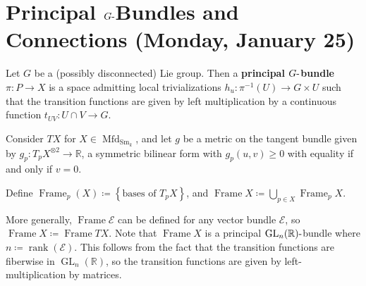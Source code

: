 \hypertarget{principal-ghbox-bundles-and-connections-monday-january-25}{%
\section{\texorpdfstring{Principal \(G{\hbox{-}}\)Bundles and
Connections (Monday, January
25)}{Principal G\{\textbackslash hbox\{-\}\}Bundles and Connections (Monday, January 25)}}\label{principal-ghbox-bundles-and-connections-monday-january-25}}

\begin{definition}

Let \(G\) be a (possibly disconnected) Lie group. Then a
\textbf{principal \(G{\hbox{-}}\)bundle} \(\pi:P\to X\) is a space
admitting local trivializations \(h_u: \pi ^{-1} (U) \to G \times U\)
such that the transition functions are given by left multiplication by a
continuous function \(t_{UV}: U \cap V \to G\).

\end{definition}

\begin{figure}
\centering
{}
\end{figure}

Consider \(TX\) for \(X\in {\operatorname{Mfd}}_{\operatorname{Sm}_k}\),
and let \(g\) be a metric on the tangent bundle given by
\(g_p: T_pX^{\otimes 2} \to {\mathbb{R}}\), a symmetric bilinear form
with \(g_p(u, v) \geq 0\) with equality if and only if \(v=0\).

\begin{definition}

Define
\({\operatorname{Frame}}_p(X) \coloneqq\left\{{\text{bases of } T_p X}\right\}\),
and
\({\operatorname{Frame}}X \coloneqq\bigcup_{p\in X} {\operatorname{Frame}}_p X\).

\end{definition}

\begin{remark}

More generally, \({\operatorname{Frame}}\mathcal{E}\) can be defined for
any vector bundle \(\mathcal{E}\), so
\({\operatorname{Frame}}X \coloneqq{\operatorname{Frame}}TX\). Note that
\({\operatorname{Frame}}X\) is a principal
\(\operatorname{GL}_n({\mathbb{R}}){\hbox{-}}\)bundle where
\(n\coloneqq\operatorname{rank}(\mathcal{E})\). This follows from the
fact that the transition functions are fiberwise in
\(\operatorname{GL}_n({\mathbb{R}})\), so the transition functions are
given by left-multiplication by matrices.

\end{remark}

